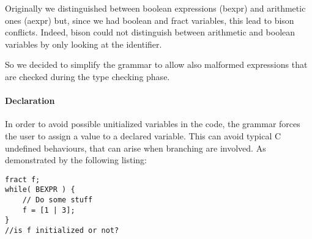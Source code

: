 Originally we distinguished between boolean expressions (bexpr) and 
arithmetic ones (aexpr) but, since we had boolean and fract variables, 
this lead to bison conflicts.
Indeed, bison could not distinguish between arithmetic and boolean variables
by only looking at the identifier. 

So we decided to simplify the grammar to allow also malformed expressions that
are checked during the type checking phase.


\paragraph{Declaration}

In order to avoid possible unitialized variables in the code, the grammar 
forces the user to assign a value to a declared variable. This can avoid
typical C undefined behaviours, that can arise when branching are involved. As
demonstrated by the following listing:
\begin{verbatim}
fract f;
while( BEXPR ) {
	// Do some stuff
	f = [1 | 3];
}
//is f initialized or not?
\end{verbatim}
